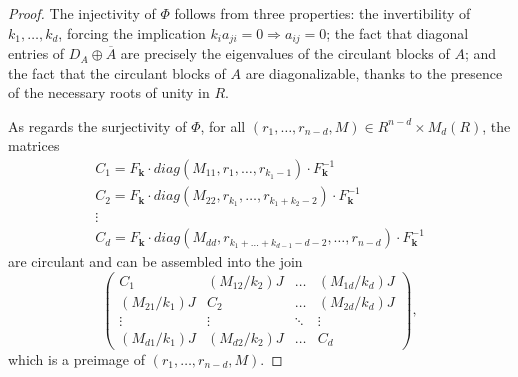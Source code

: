\documentclass[12pt, a4paper]{amsart}
\numberwithin{equation}{section} %
\theoremstyle{plain}
\theoremstyle{definition}
\theoremstyle{plain}
\theoremstyle{remark}
\newcommand{\ones}{J}
\begin{document}
\begin{proof}
The injectivity of $\Phi$ follows from three properties: the invertibility of $k_1,\dots,k_d$, forcing the implication 
$k_ia_{ji}=0\Rightarrow a_{ij}=0$; the fact that diagonal entries of $D_A\oplus\overline{A}$ are precisely the eigenvalues of the circulant blocks of $A$; and the fact that the circulant blocks of $A$ are diagonalizable, thanks to the presence of the necessary roots of unity in $R$.

As regards the surjectivity of $\Phi$, for all $(r_1,\dots,r_{n-d},M)\in R^{n-d}\times M_d(R)$, the matrices
\[\begin{array}{l}
     C_1=F_\mathbf{k}\cdot diag(M_{11},r_{1},\dots,r_{k_1-1})\cdot F_\mathbf{k}^{-1} \\
     C_2=F_\mathbf{k}\cdot diag(M_{22},r_{k_1},\dots,r_{k_1+k_2-2})\cdot F_\mathbf{k}^{-1} \\ 
     \vdots \\
     C_d=F_\mathbf{k}\cdot diag(M_{dd},r_{k_1+\dots+k_{d-1}-d-2},\dots,r_{n-d})\cdot F_\mathbf{k}^{-1}
\end{array}
\]
are circulant and can be assembled into the join
\[
\left(
\begin{array}{c|c|c|c}
   C_1 & (M_{12}/k_2)\ones & \dots & (M_{1d}/k_d)\ones \\
   \hline
   (M_{21}/k_1)\ones & C_2 & \dots & (M_{2d}/k_d)\ones \\
   \hline
   \vdots & \vdots & \ddots & \vdots \\
   \hline
   (M_{d1}/k_1)\ones & (M_{d2}/k_2)\ones & \dots & C_d
\end{array}
\right),
\]
which is a preimage of $(r_1,\dots,r_{n-d},M)$.
\end{proof}
\end{document}

